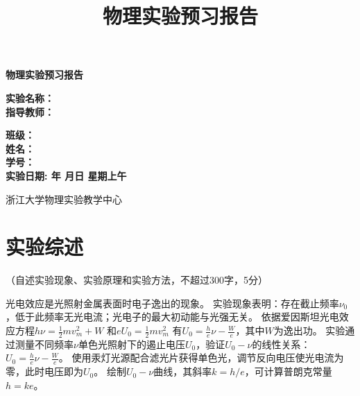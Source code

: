 \documentclass[10pt,a4paper]{ctexart}
\title{\xiaochu\textbf{物理实验预习报告}}
\author{}
\date{}
\newcommand{\myspace}[1]{\par\vspace{#1\baselineskip}} %
\newcommand{\chuhao}{\fontsize{42pt}{48pt}\selectfont}
\newcommand{\sanhao}{\fontsize{16pt}{20pt}\selectfont}
\newcommand{\sihao}{\fontsize{14pt}{18pt}\selectfont}
\newcommand{\xiaosi}{\fontsize{12pt}{16pt}\selectfont}
\begin{document}
\vspace*{36pt} %

\begin{center}


    \chuhao\textbf{物理实验预习报告}
    \vspace{13pt}
    \vspace{13pt}
    \vspace{13pt}
    \vspace{13pt}
    
    \sanhao\textbf{实验名称：\underline{}} \\[10pt]
    \sanhao\textbf{指导教师：\underline{}} \\[30pt]
    
    \myspace{7}
    
   \sihao\textbf{班级：\underline{\makebox[6cm]{}}} \\[10pt]
    \sihao\textbf{姓名：\underline{\makebox[6cm]{}}} \\[10pt]
    \sihao\textbf{学号：\underline{\makebox[6cm]{}}} \\[30pt]
    
    \sihao\textbf{实验日期: \underline{}年 \underline{}月\underline{}日  星期\underline{}上午}
    
    \vspace{18pt}
    \sihao 浙江大学物理实验教学中心
    
\end{center}

\newpage

\section{实验综述}

\xiaosi （自述实验现象、实验原理和实验方法，不超过300字，5分）

光电效应是光照射金属表面时电子逸出的现象。
实验现象表明：存在截止频率$\nu_0$，低于此频率无光电流；光电子的最大初动能与光强无关。
依据爱因斯坦光电效应方程$h\nu = \frac{1}{2}mv_m^2 + W$ 和$eU_0=\frac{1}{2}mv^2_m$ 有$U_0=\frac{h}{e} \nu-\frac{W}{e}$，其中$W$为逸出功。
实验通过测量不同频率$\nu$单色光照射下的遏止电压$U_0$，验证$U_0-\nu$的线性关系：$U_0 = \frac{h}{e}\nu - \frac{W}{e}$。
使用汞灯光源配合滤光片获得单色光，调节反向电压使光电流为零，此时电压即为$U_0$。
绘制$U_0-\nu$曲线，其斜率$k = h/e$，可计算普朗克常量$h = ke$。
\end{document}
